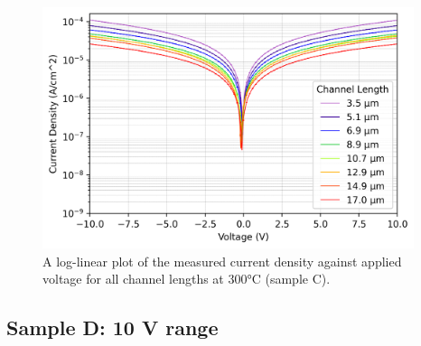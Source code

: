 \begin{figure}[h]
    \centering
    \includegraphics[width=0.97\textwidth]{Chapter6/Figs/Raster/Sample C 2019/10V_Current_Density_vs_Voltage_Temperature_300_log.png}
    \caption{A log-linear plot of the measured current density against applied voltage for all channel lengths at 300\si{\degreeCelsius} (sample C).}
    \label{appfig:current_density_300}
\end{figure}

\subsection{Sample D: 10 \si{\volt} range}
\label{app:J_V_sample_D_10V}

